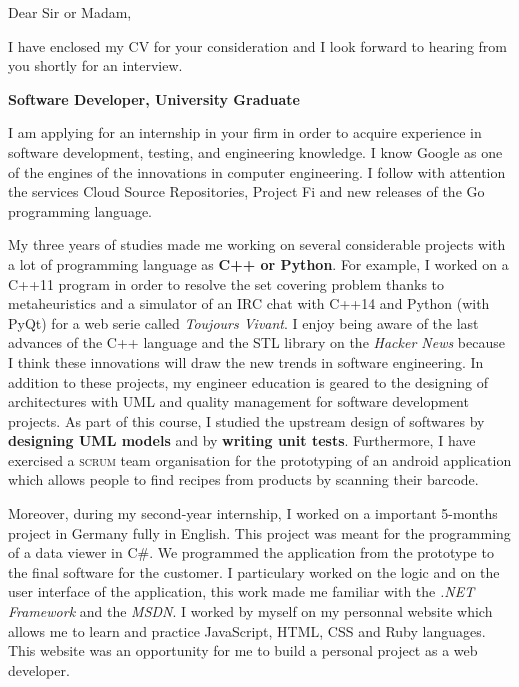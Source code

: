 \date{\today}
\opening{Dear Sir or Madam,}
\closing{I have enclosed my CV for your consideration and I look forward to hearing from you shortly for an interview.}

\makelettertitle

\textbf{Software Developer, University Graduate}

\introduce{}
I am applying for an internship in your firm in order to acquire experience in software development, testing, and engineering knowledge. I know Google as one of the engines of the innovations in computer engineering. I follow with attention the services Cloud Source Repositories, Project Fi and new releases of the Go programming language.

My three years of studies made me working on several considerable projects with a lot of programming language as \textbf{C++ or Python}. For example, I worked on a C++11 program in order to resolve the set covering problem thanks to metaheuristics and a simulator of an IRC chat with C++14 and Python (with PyQt) for a web serie called \textit{Toujours Vivant}. I enjoy being aware of the last advances of the C++ language and the STL library on the \textit{Hacker News} because I think these innovations will draw the new trends in software engineering. In addition to these projects, my engineer education is geared to the designing of architectures with UML and quality management for software development projects. As part of this course, I studied the upstream design of softwares by \textbf{designing UML models} and by \textbf{writing unit tests}. Furthermore, I have exercised a \textsc{scrum} team organisation for the prototyping of an android application which allows people to find recipes from products by scanning their barcode.

Moreover, during my second-year internship, I worked on a important 5-months project in Germany fully in English. This project was meant for the programming of a data viewer in C\#. We programmed the application from the prototype to the final software for the customer. I particulary worked on the logic and on the user interface of the application, this work made me familiar with the \textit{.NET Framework} and the \textit{MSDN}. I worked by myself on my personnal website which allows me to learn and practice JavaScript, HTML, CSS and Ruby languages. This website was an opportunity for me to build a personal project as a web developer. \conclude{}

\makeletterclosing
